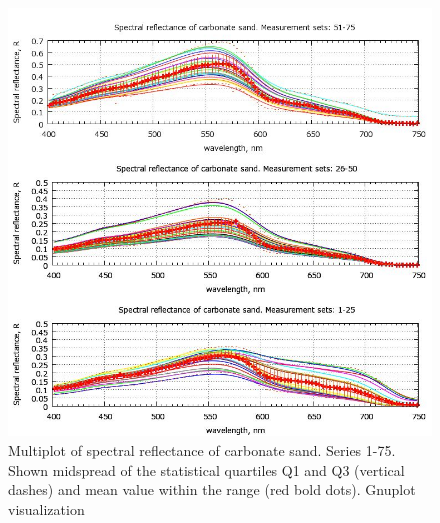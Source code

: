 \documentclass[10pt, a4paper]{article}
\begin{document}
\begin{figure}
\begin{center}
\includegraphics[scale=0.5]{GNU-16.jpg}
\caption{Multiplot of spectral reflectance of carbonate sand. Series 1-75. Shown midspread of the statistical quartiles Q1 and Q3 (vertical dashes) and
mean value within the range (red bold dots). Gnuplot visualization­}
\label{fig:36}
\end{center}
\end{figure}
\end{document}

